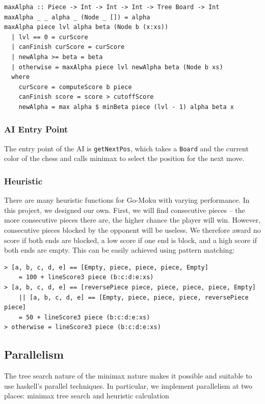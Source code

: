 \documentclass[twoside,11pt]{homework}
\begin{document}
\begin{verbatim}
maxAlpha :: Piece -> Int -> Int -> Int -> Tree Board -> Int
maxAlpha _ _ alpha _ (Node _ []) = alpha
maxAlpha piece lvl alpha beta (Node b (x:xs))
  | lvl == 0 = curScore
  | canFinish curScore = curScore
  | newAlpha >= beta = beta
  | otherwise = maxAlpha piece lvl newAlpha beta (Node b xs)
  where
    curScore = computeScore b piece
    canFinish score = score > cutoffScore
    newAlpha = max alpha $ minBeta piece (lvl - 1) alpha beta x
\end{verbatim}


\subsubsection{AI Entry Point}
The entry point of the AI is \texttt{getNextPos}, which takes a \texttt{Board} and the current color of the chess and calls minimax to select the position for the next move.

\subsubsection{Heuristic}
There are many heuristic functions for Go-Moku with varying performance. In this project, we designed our own. First, we will find consecutive pieces -- the more consecutive pieces there are, the higher chance the player will win. However, consecutive pieces blocked by the opponent will be useless. We therefore award no score if both ends are blocked, a low score if one end is block, and a high score if both ends are empty. This can be easily achieved using pattern matching:
\begin{verbatim}
> [a, b, c, d, e] == [Empty, piece, piece, piece, Empty]
    = 100 + lineScore3 piece (b:c:d:e:xs)
> [a, b, c, d, e] == [reversePiece piece, piece, piece, piece, Empty]
    || [a, b, c, d, e] == [Empty, piece, piece, piece, reversePiece piece]
    = 50 + lineScore3 piece (b:c:d:e:xs)
> otherwise = lineScore3 piece (b:c:d:e:xs)
\end{verbatim}

\subsection{Parallelism}
The tree search nature of the minimax nature makes it possible and suitable to use haskell's parallel techniques. In particular, we implement parallelism at two places: minimax tree search and heuristic calculation
\end{document}
